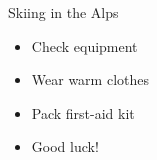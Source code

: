 \documentclass[12pt]{beamer}
\begin{document}
\begin{frame}[t]{Skiing in the Alps}

\begin{itemize}
  \item Check equipment
  \item Wear warm clothes
  \item Pack first-aid kit
  \item Good luck!
\end{itemize}

\end{frame}
\end{document}
